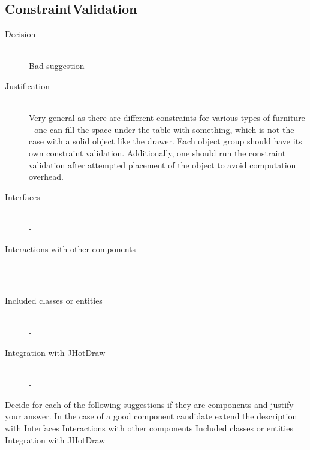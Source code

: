\subsection{ConstraintValidation}
	\begin{description}
		\item[Decision] \hfill \\ Bad suggestion
		\item[Justification] \hfill \\ Very general as there are different constraints for various types of furniture - one can fill the space under the table with something, which is not the case with a solid object like the drawer. Each object group should have its own constraint validation. Additionally, one should run the constraint validation after attempted placement of the object to avoid computation overhead.
		\item[Interfaces] \hfill \\ -
		\item[Interactions with other components] \hfill \\ -
		\item[Included classes or entities] \hfill \\ -
		\item[Integration with JHotDraw] \hfill \\ -
	\end{description}

Decide for each of the following suggestions if they are components and justify your
answer. In the case of a good component candidate extend the description with
Interfaces
Interactions with other components
Included classes or entities
Integration with JHotDraw




